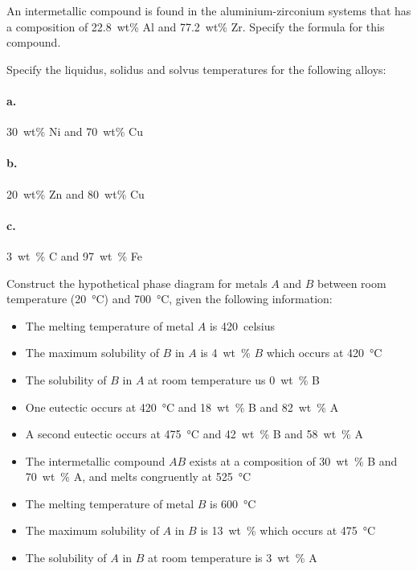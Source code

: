 
 An intermetallic compound is found in the aluminium-zirconium systems that has a composition of \qty{22,8}{wt}\% Al and \qty{77,2}{wt}\% Zr. Specify the formula for this compound.

 Specify the liquidus, solidus and solvus temperatures for the following alloys:

\paragraph{a.} \qty{30}{wt}\% Ni and \qty{70}{wt}\% Cu

\paragraph{b.} \qty{20}{wt}\% Zn and \qty{80}{wt}\% Cu

\paragraph{c.} \qty{3}{wt\%} C and \qty{97}{wt\%} Fe

 Construct the hypothetical phase diagram for metals $A$ and $B$ between room temperature (\qty{20}{\celsius}) and \qty{700}{\celsius}, given the following information:
\begin{itemize}
  \item The melting temperature of metal $A$ is \qty{420}{celsius}
  \item The maximum solubility of $B$ in $A$ is \qty{4}{wt\%} $B$ which occurs at \qty{420}{\celsius}
  \item The solubility of $B$ in $A$ at room temperature us \qty{0}{wt\%} B
  \item One eutectic occurs at \qty{420}{\celsius}  and \qty{18}{wt\%} B and \qty{82}{wt\%} A
  \item A second eutectic occurs at \qty{475}{\celsius}  and \qty{42}{wt\%} B and \qty{58}{wt\%} A
  \item The intermetallic compound $AB$ exists at a composition of \qty{30}{wt\%} B and \qty{70}{wt\%} A, and melts congruently at \qty{525}{\celsius}
  \item The melting temperature of metal $B$ is \qty{600}{\celsius} 
  \item The maximum solubility of $A$ in $B$ is \qty{13}{wt\%} which occurs at \qty{475}{\celsius}
  \item The solubility of $A$ in $B$ at room temperature is \qty{3}{wt\%} A
\end{itemize}
